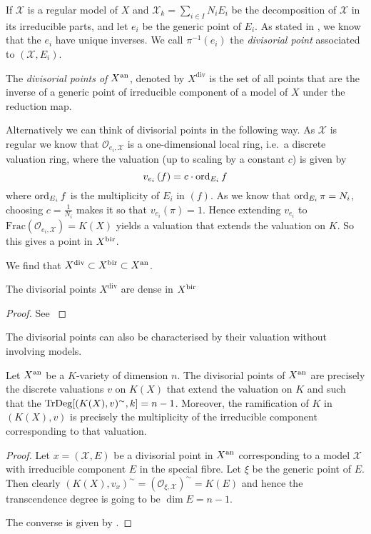 If $\mathscr X$ is a regular model of $X$ and $\mathscr X_k = \sum_{i \in I} N_i E_i$ be the decomposition of $\mathscr X$ in its irreducible parts, and let $e_i$ be the generic point of $E_i$. 
As stated in \cite[thm 2.2.4]{berkovichSpectralTheoryAnalytic2012}, we know that the $e_i$ have unique inverses. 
We call $\pi^{-1}(e_i)$ the \emph{divisorial point} associated to $(\mathscr X, E_i)$.
\begin{definition}
	The \emph{divisorial points of $X{}^{\text{an}}$}, denoted by  $X^{\text{div}}$ is the set of all points that are the inverse of a generic point of irreducible component of a model of $X$ under the reduction map. 
\end{definition} 
Alternatively we can think of divisorial points in the following way. 
As  $\mathscr X$ is regular we know that $\mathcal{O}_{e_i, \mathscr X}$ is a one-dimensional local ring, i.e.\ a discrete valuation ring, where the valuation (up to scaling by a constant $c$) is given by \[
	v_{e_i}\left( f \right)  = c\cdot \operatorname{ord}_{E_i} f
\] 
where $\operatorname{ord}_{E_i} f$ is the multiplicity of $E_i$ in $(f)$. 
As we know that  $\operatorname{ord}_{E_i} \pi = N_i$, choosing $c = \frac{1}{N_i}$ makes it so that $v_{e_i}(\pi) = 1$. 
Hence extending $v_{e_i}$ to $\mathrm{Frac}(\mathcal{O}_{e_i, \mathscr X}) = K(X)$ yields a valuation that extends the valuation on $K$. 
So this gives a point in $X{}^{\text{bir}}$. 

We find that $X^{\text{div}} \subset X{}^{\text{bir}} \subset X{}^{\text{an}}$. 
\begin{lemma}
	The divisorial points $X^{\text{div}}$ are dense in $X{}^{\text{bir}}$  
\end{lemma}
\begin{proof}
	See \cite[prop.\ 2.4.9]{mustataWeightFunctionsNonArchimedean2015}
\end{proof}

The divisorial points can also be characterised by their valuation without involving models. 
\begin{lemma}\label{lem:char_div_point}
	Let $X{}^{\text{an}}$ be a $K$-variety of dimension $n$. 
	The divisorial points of $X{}^{\text{an}}$ are precisely the discrete valuations $v$ on $K(X)$ that extend the valuation on $K$ and such that the $\operatorname{TrDeg} [(K(X),v)^{\sim}, k] = n-1$.
	Moreover, the ramification of $K$ in $(K(X), v)$ is precisely the multiplicity of the irreducible component corresponding to that valuation.
\end{lemma}
\begin{proof}
	Let $x = (\mathscr X, E)$ be a divisorial point in $X{}^{\text{an}}$ corresponding to a model $\mathscr X$ with irreducible component $E$ in the special fibre.
	Let $\xi$ be the generic point of $E$. 
	Then clearly $(K(X), v_x)^{\sim} = (\mathcal{O}_{\xi, \mathscr X})^{\sim} = K(E)$ and hence the transcendence degree is going to be  $\dim E = n-1$.

	The converse is given by \cite[lem 2.45]{kollarBirationalGeometryAlgebraic1998}. 
\end{proof}

